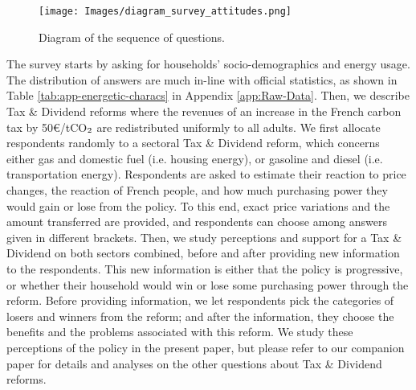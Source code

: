 \documentclass[english,5p,authoryear]{elsarticle}
\begin{document}
\begin{figure}[!htbp]
\centering
\texttt{[image: Images/diagram\_survey\_attitudes.png]}
\caption{Diagram of the sequence of questions.}
\label{fig:survey}
\end{figure}
The survey starts by asking for households' socio-demographics and energy usage. The distribution of answers are much in-line with official statistics, as shown in Table \ref{tab:app-energetic-characs} in Appendix \ref{app:Raw-Data}. Then, we describe Tax \& Dividend reforms where the revenues of an increase in the French carbon tax by 50\euro{}/tCO$_\textnormal{2}$ are redistributed uniformly to all adults. We first allocate respondents randomly to a sectoral Tax \& Dividend reform, which concerns either gas and domestic fuel (i.e. housing energy), or gasoline and diesel (i.e. transportation energy). Respondents are asked to estimate their reaction to price changes, the reaction of French people, and how much purchasing power they would gain or lose from the policy. To this end, exact price variations and the amount transferred are provided, and respondents can choose among answers given in different brackets. Then, we study perceptions and support for a Tax \& Dividend on both sectors combined, before and after providing new information to the respondents. This new information is either that the policy is progressive, or whether their household would win or lose some purchasing power through the reform. Before providing information, we let respondents pick the categories of losers and winners from the reform; and after the information, they choose the benefits and the problems associated with this reform. We study these perceptions of the policy in the present paper, but please refer to our companion paper \citep{douenne_can_2019} for details and analyses on the other questions about Tax \& Dividend reforms. %
\end{document}
